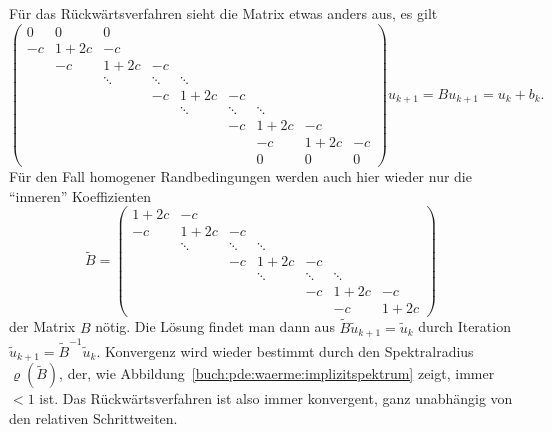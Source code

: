 Für das Rückwärtsverfahren sieht die Matrix etwas anders aus, es gilt
\begin{equation}
\begin{pmatrix}
   0  &    0  &   0  &      &      &      &      &      &      \\
  -c  &  1+2c &  -c  &      &      &      &      &      &      \\
      &   -c  & 1+2c &  -c  &      &      &      &      &      \\
      &       &\ddots&\ddots&\ddots&      &      &      &      \\
      &       &      &  -c  & 1+2c &  -c  &      &      &      \\
      &       &      &      &\ddots&\ddots&\ddots&      &      \\
      &       &      &      &      &  -c  & 1+2c &  -c  &      \\
      &       &      &      &      &      &  -c  & 1+2c &  -c  \\
      &       &      &      &      &      &   0  &   0  &   0  
\end{pmatrix}
u_{k+1}
=
Bu_{k+1}
=
u_k + b_k.
\end{equation}
Für den Fall homogener Randbedingungen werden auch hier wieder
nur die ``inneren'' Koeffizienten
\[
\tilde{B}
=
\begin{pmatrix}
 1+2c &  -c  &      &      &      &      &      \\
  -c  & 1+2c &  -c  &      &      &      &      \\
      &\ddots&\ddots&\ddots&      &      &      \\
      &      &  -c  & 1+2c &  -c  &      &      \\
      &      &      &\ddots&\ddots&\ddots&      \\
      &      &      &      &  -c  & 1+2c &  -c  \\
      &      &      &      &      &  -c  & 1+2c 
\end{pmatrix}
\]
der Matrix $B$ nötig.
Die Lösung findet man dann aus $\tilde{B}\tilde{u}_{k+1}=\tilde{u}_k$
durch Iteration $\tilde{u}_{k+1}=\tilde{B}^{-1} \tilde{u}_k$.
Konvergenz wird wieder bestimmt durch den Spektralradius $\varrho(\tilde{B})$,
der, wie Abbildung~\ref{buch:pde:waerme:implizitspektrum} zeigt, immer
$<1$ ist.
Das Rückwärtsverfahren ist also immer konvergent, ganz unabhängig von
den relativen Schrittweiten.
